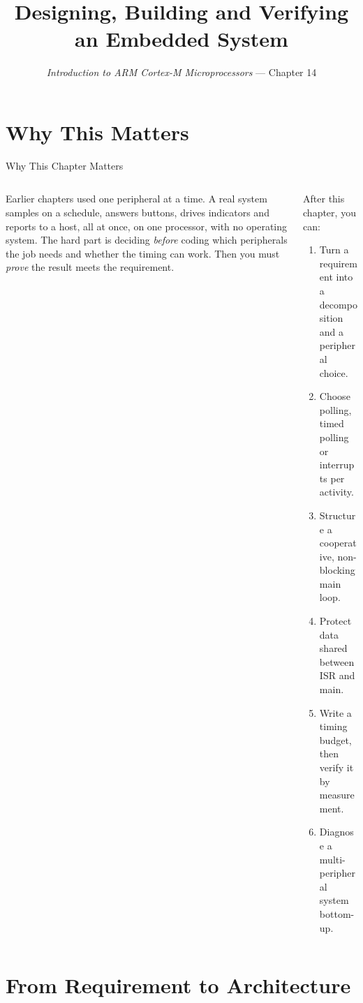 \documentclass[9pt,aspectratio=169,xcolor=table]{beamer}
\title{Designing, Building and Verifying an Embedded System}
\subtitle{\emph{Introduction to ARM Cortex-M Microprocessors} --- Chapter 14}
\begin{document}
\titlepage

\section{Why This Matters}

\begin{frame}{Why This Chapter Matters}
    \begin{columns}[T]
    \begin{column}{.47\textwidth}
        {\normalsize Earlier chapters used one peripheral at a time. A real system samples on a schedule, answers buttons, drives indicators and reports to a host, all at once, on one processor, with no operating system. The hard part is deciding \emph{before} coding which peripherals the job needs and whether the timing can work. Then you must \emph{prove} the result meets the requirement.}
    \end{column}
    \begin{column}{.51\textwidth}
        \begin{block}{After this chapter, you can:}
        {\small
        \begin{enumerate}\itemsep2pt
            \item Turn a requirement into a decomposition and a peripheral choice.
            \item Choose polling, timed polling or interrupts per activity.
            \item Structure a cooperative, non-blocking main loop.
            \item Protect data shared between ISR and main.
            \item Write a timing budget, then verify it by measurement.
            \item Diagnose a multi-peripheral system bottom-up.
        \end{enumerate}}
        \end{block}
    \end{column}
    \end{columns}
\end{frame}


\section{From Requirement to Architecture}
\end{document}
